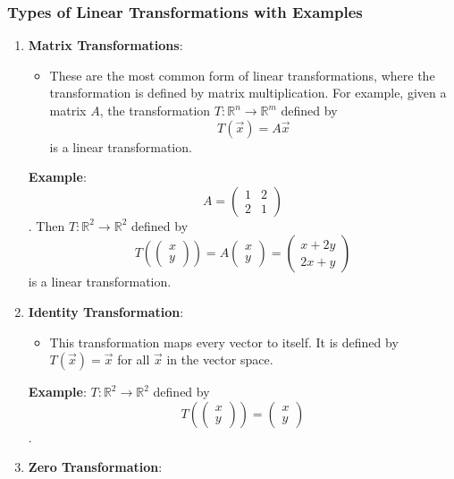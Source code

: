 \documentclass[11pt]{article}
\providecommand{\tightlist}{%
      \setlength{\itemsep}{0pt}\setlength{\parskip}{0pt}}
\begin{document}
\hypertarget{types-of-linear-transformations-with-examples}{%
\subsubsection{Types of Linear Transformations with
Examples}\label{types-of-linear-transformations-with-examples}}

\begin{enumerate}
\def\labelenumi{\arabic{enumi}.}
\item
  \textbf{Matrix Transformations}:

  \begin{itemize}
  \tightlist
  \item
    These are the most common form of linear transformations, where the
    transformation is defined by matrix multiplication. For example,
    given a matrix \(A\), the transformation
    \(T: \mathbb{R}^n \to \mathbb{R}^m\) defined by
    \[T(\vec{x}) = A\vec{x}\] is a linear transformation.
  \end{itemize}

  \textbf{Example}:
  \[A = \begin{pmatrix} 1 & 2 \\ 2 & 1 \end{pmatrix}\]. Then
  \(T: \mathbb{R}^2 \to \mathbb{R}^2\) defined by
  \[T\left(\begin{pmatrix} x \\ y \end{pmatrix}\right) = A\begin{pmatrix} x \\ y \end{pmatrix} = \begin{pmatrix} x + 2y \\ 2x + y \end{pmatrix}\]
  is a linear transformation.
\item
  \textbf{Identity Transformation}:

  \begin{itemize}
  \tightlist
  \item
    This transformation maps every vector to itself. It is defined by
    \(T(\vec{x}) = \vec{x}\) for all \(\vec{x}\) in the vector space.
  \end{itemize}

  \textbf{Example}: \(T: \mathbb{R}^2 \to \mathbb{R}^2\) defined by
  \[T\left(\begin{pmatrix} x \\ y \end{pmatrix}\right) = \begin{pmatrix} x \\ y \end{pmatrix}\].
\item
  \textbf{Zero Transformation}:


\end{enumerate}
\end{document}
